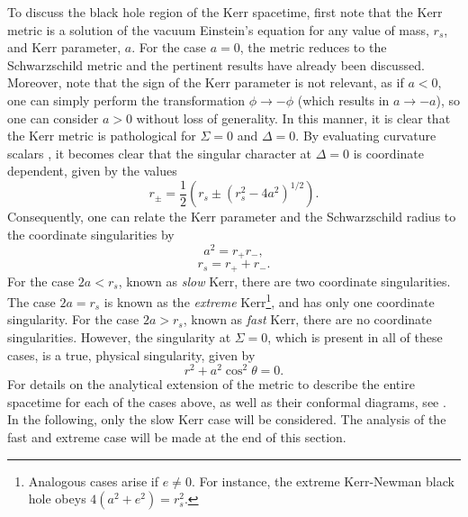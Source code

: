 \documentclass[
12pt,		%
openright,	%
twoside,  %
a4paper,			%
chapter=TITLE,		%
english,			%
french,				%
spanish,			%
brazil				%
]{USPSC-classe/USPSC}
\begin{document}
To discuss the black hole region of the Kerr spacetime, first note that the Kerr metric is a solution of the vacuum Einstein's equation for any value of mass, $r_s$, and Kerr parameter, $a$. For the case $a=0$, the metric reduces to the Schwarzschild metric and the pertinent results have already been discussed. Moreover, note that the sign of the Kerr parameter is not relevant, as if $a<0$, one can simply perform the transformation  $\phi\to-\phi$ (which results in $a\to-a$), so one can consider $a>0$ without loss of generality. In this manner, it is clear that the Kerr metric is pathological for $\Sigma=0$ and $\Delta=0$. By evaluating curvature scalars \cite{Poisson2004}, it becomes clear that the singular character at $\Delta=0$ is coordinate dependent, given by the values
\begin{equation}\label{coorKerr}
    r_\pm=\frac{1}{2}\left(r_s\pm\left(r_s^2-4a^2\right)^{1/2}\right).
\end{equation}
Consequently, one can relate the Kerr parameter and the Schwarzschild radius to the coordinate singularities by
\begin{equation}\label{radius12}
    a^2=r_+r_-,
\end{equation}
\begin{equation}\label{radius13}
    r_s=r_++r_-.
\end{equation}
For the case $2a<r_s$, known as \textit{slow} Kerr, there are two coordinate singularities. The case $2a=r_s$ is known as the \textit{extreme} Kerr\footnote{Analogous cases arise if $e\neq0$. For instance, the extreme Kerr-Newman black hole obeys $4(a^2+e^2)=r_s^2$.}, and has only one coordinate singularity. For the case $2a>r_s$, known as \textit{fast} Kerr, there are no coordinate singularities. However, the singularity at $\Sigma=0$, which is present in all of these cases, is a true, physical singularity, given by
\begin{equation}
    r^2+a^2\cos^2\theta=0.
\end{equation}
For details on the analytical extension of the metric to describe the entire spacetime for each of the cases above, as well as their conformal diagrams, see \cite{ONeill1995}. In the following, only the slow Kerr case will be considered. The analysis of the fast and extreme case will be made at the end of this section. 
\end{document}
